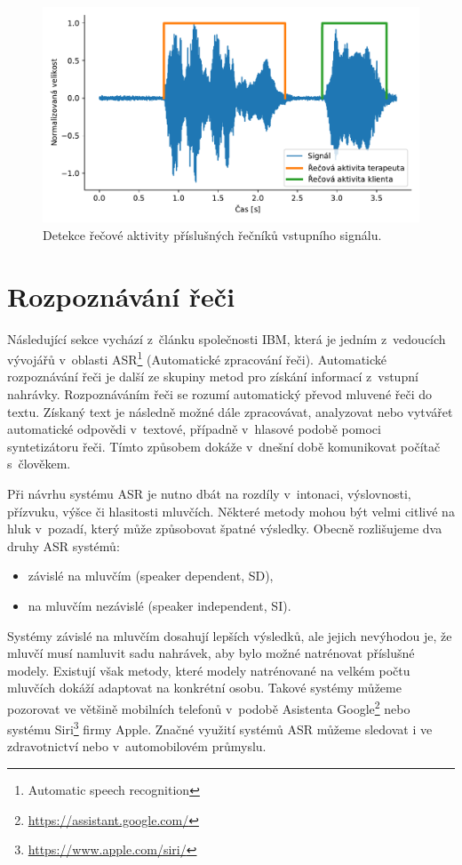 \begin{figure}[ht]
  \centering
  \includegraphics[width=\linewidth]{obrazky-figures/diarization.pdf}
  \caption{Detekce řečové aktivity příslušných řečníků vstupního signálu.}
  \label{fig:Diar_smooth}
\end{figure}

\section{Rozpoznávání řeči}
\label{section:ASR}
Následující sekce vychází z~článku společnosti IBM\cite{asr_ibm}, která je jedním z~vedoucích vývojářů v~oblasti ASR\footnote{Automatic speech recognition} (Automatické zpracování řeči). Automatické rozpoznávání řeči je další ze skupiny metod pro získání informací z~vstupní nahrávky. Rozpoznáváním řeči se rozumí automatický převod mluvené řeči do textu. Získaný text je následně možné dále zpracovávat, analyzovat nebo vytvářet automatické odpovědi v~textové, případně v~hlasové podobě pomoci syntetizátoru řeči. Tímto způsobem dokáže v~dnešní době komunikovat počítač s~člověkem.

Při návrhu systému ASR je nutno dbát na rozdíly v~intonaci, výslovnosti, přízvuku, výšce či hlasitosti mluvčích. Některé metody mohou být velmi citlivé na hluk v~pozadí, který může způsobovat špatné výsledky. Obecně rozlišujeme dva druhy ASR systémů:

\begin{itemize}
    \item závislé na mluvčím (speaker dependent, SD),
    \item na mluvčím nezávislé (speaker independent, SI).
\end{itemize}

Systémy závislé na mluvčím dosahují lepších výsledků, ale jejich nevýhodou je, že mluvčí musí namluvit sadu nahrávek, aby bylo možné natrénovat příslušné modely. Existují však metody, které modely natrénované na velkém počtu mluvčích dokáží adaptovat na konkrétní osobu. Takové systémy můžeme pozorovat ve většině mobilních telefonů v~podobě Asistenta Google\footnote{\url{https://assistant.google.com/}} nebo systému Siri\footnote{\url{https://www.apple.com/siri/}} firmy Apple. Značné využití systémů ASR můžeme sledovat i ve zdravotnictví nebo v~automobilovém průmyslu. 

